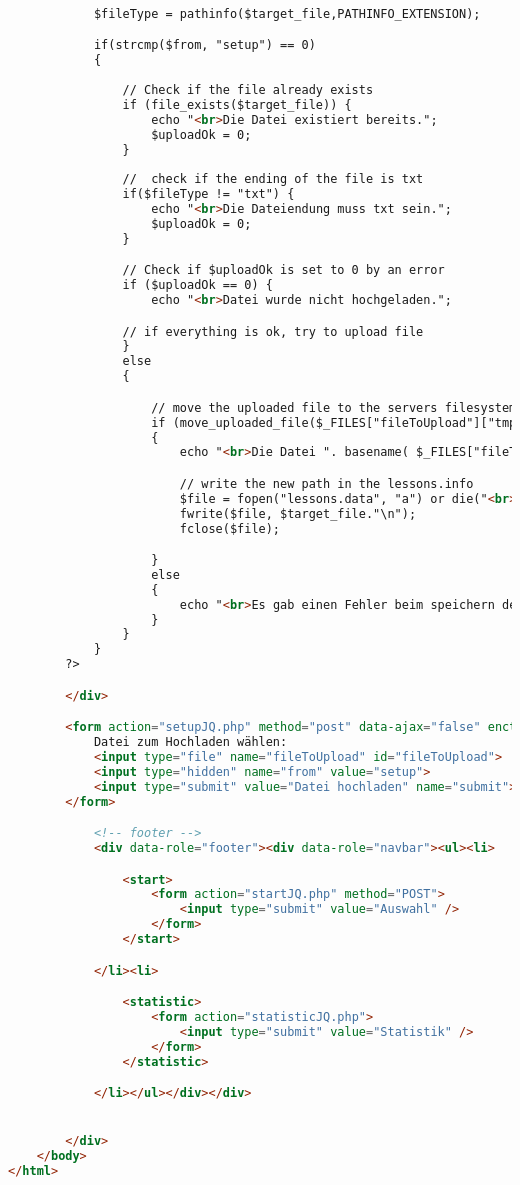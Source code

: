 \documentclass{scrartcl}
\begin{document}
\begin{itemize}
\begin{lstlisting}[language=html]
			
			$fileType = pathinfo($target_file,PATHINFO_EXTENSION);

			if(strcmp($from, "setup") == 0)
			{
			
				// Check if the file already exists
				if (file_exists($target_file)) {
					echo "<br>Die Datei existiert bereits.";
					$uploadOk = 0;
				}
		
				//  check if the ending of the file is txt
				if($fileType != "txt") {
					echo "<br>Die Dateiendung muss txt sein.";
					$uploadOk = 0;
				}

				// Check if $uploadOk is set to 0 by an error
				if ($uploadOk == 0) {
					echo "<br>Datei wurde nicht hochgeladen.";

				// if everything is ok, try to upload file
				} 
				else 
				{

					// move the uploaded file to the servers filesystem
					if (move_uploaded_file($_FILES["fileToUpload"]["tmp_name"], $target_file))
					{
						echo "<br>Die Datei ". basename( $_FILES["fileToUpload"]["name"]). " wurde hochgeladen.";

						// write the new path in the lessons.info
						$file = fopen("lessons.data", "a") or die("<br>Die Lessons-Datei kann nicht geöffnet werden!");		
						fwrite($file, $target_file."\n");
						fclose($file);

					} 
					else 
					{
						echo "<br>Es gab einen Fehler beim speichern der hochgeladenen Datei.";
					}
				}
			}
		?>		

		</div>

		<form action="setupJQ.php" method="post" data-ajax="false" enctype="multipart/form-data">
			Datei zum Hochladen wählen:
			<input type="file" name="fileToUpload" id="fileToUpload">
			<input type="hidden" name="from" value="setup">
			<input type="submit" value="Datei hochladen" name="submit">
		</form>

			<!-- footer -->
			<div data-role="footer"><div data-role="navbar"><ul><li>

				<start>
					<form action="startJQ.php" method="POST">
						<input type="submit" value="Auswahl" />
					</form>
				</start>

			</li><li>

				<statistic>
					<form action="statisticJQ.php">
						<input type="submit" value="Statistik" />
					</form>
				</statistic>

			</li></ul></div></div>


		</div> 
	</body>
</html>
\end{lstlisting}
\end{itemize}
\end{document}
